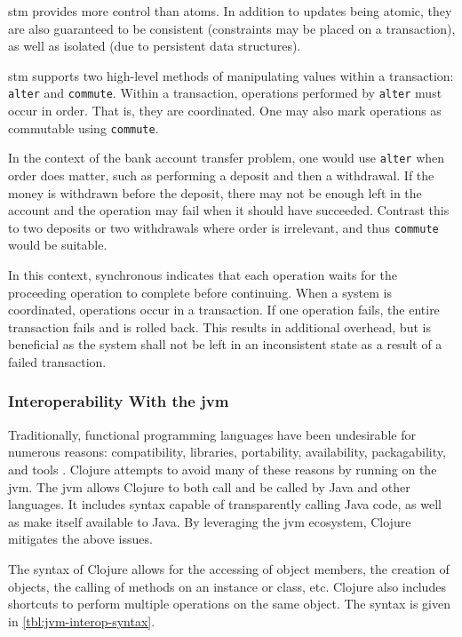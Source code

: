 			\gls{stm} provides more control than atoms.  In addition to updates being atomic, they are also guaranteed to be consistent (constraints may be placed on a transaction), as well as isolated (due to persistent data structures).
			
			\gls{stm} supports two high-level methods of manipulating values within a transaction:  \texttt{alter} and \texttt{commute}.  Within a transaction, operations performed by \texttt{alter} must occur in order.  That is, they are coordinated.  One may also mark operations as commutable using \texttt{commute}.
			
			In the context of the bank account transfer problem, one would use \texttt{alter} when order does matter, such as performing a deposit and then a withdrawal.  If the money is withdrawn before the deposit, there may not be enough left in the account and the operation may fail when it should have succeeded.  Contrast this to two deposits or two withdrawals where order is irrelevant, and thus \texttt{commute} would be suitable.
			
			In this context, synchronous indicates that each operation waits for the proceeding operation to complete before continuing.  When a system is coordinated, operations occur in a transaction.  If one operation fails, the entire transaction fails and is rolled back.  This results in additional overhead, but is beneficial as the system shall not be left in an inconsistent state as a result of a failed transaction.
			
		\subsubsection{Interoperability With the \gls{jvm}}
			Traditionally, functional programming languages have been undesirable for numerous reasons:  compatibility, libraries, portability, availability, packagability, and tools \cite{no-fp-98}.  Clojure attempts to avoid many of these reasons by running on the \gls{jvm}.  The \gls{jvm} allows Clojure to both call and be called by Java and other languages.  It includes syntax capable of transparently calling Java code, as well as make itself available to Java.  By leveraging the \gls{jvm} ecosystem, Clojure mitigates the above issues.
			
			The syntax of Clojure allows for the accessing of object members, the creation of objects, the calling of methods on an instance or class, etc.  Clojure also includes shortcuts to perform multiple operations on the same object.  The syntax is given in \cref{tbl:jvm-interop-syntax}.
			
